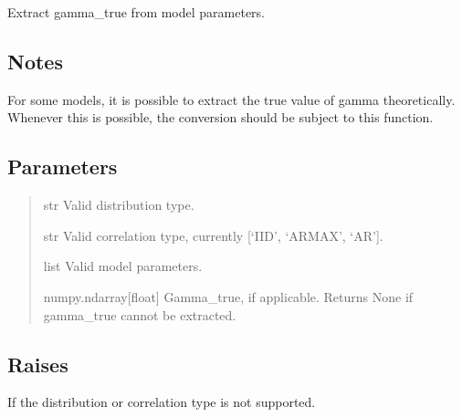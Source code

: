 \documentclass[a4paper,11pt,openany,english]{sphinxmanual}
\begin{document}
\begin{fulllineitems}
\end{fulllineitems}


\begin{fulllineitems}
\label{\detokenize{api_misc:xtremes.miscellaneous.modelparams2gamma_true}}
\pysigstartsignatures
{}
\pysigstopsignatures
\sphinxAtStartPar
Extract gamma\_true from model parameters.


\subsection{Notes}
\label{\detokenize{api_misc:id41}}
\sphinxAtStartPar
For some models, it is possible to extract the true value
of gamma theoretically. Whenever this is possible, the conversion
should be subject to this function.


\subsection{Parameters}
\label{\detokenize{api_misc:id42}}\begin{quote}\begin{description}
\sphinxAtStartPar
str
Valid distribution type.

\sphinxAtStartPar
str
Valid correlation type, currently {[}‘IID’, ‘ARMAX’, ‘AR’{]}.

\sphinxAtStartPar
list
Valid model parameters.

\sphinxAtStartPar
numpy.ndarray{[}float{]}
Gamma\_true, if applicable. Returns None if gamma\_true cannot be extracted.

\end{description}\end{quote}


\subsection{Raises}
\label{\detokenize{api_misc:id43}}\begin{description}
\sphinxAtStartPar
If the distribution or correlation type is not supported.


\end{description}
\end{fulllineitems}
\end{document}
